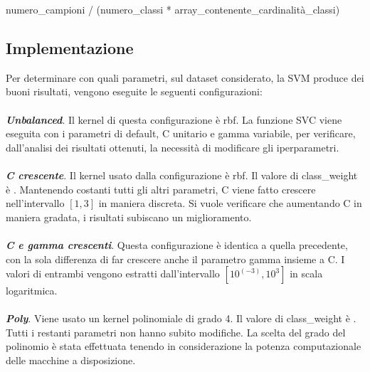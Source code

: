 \documentclass[12pt,a4paper,oneside,hidelinks]{report}
\begin{document}
\begin{center}
numero\_campioni / (numero\_classi * array\_contenente\_cardinalità\_classi)
\end{center}

\subsection{Implementazione}
Per determinare con quali parametri, sul dataset considerato, la SVM produce dei buoni risultati, vengono eseguite le seguenti configurazioni:

\paragraph*{}
\textbf{\textit{Unbalanced}}. Il kernel di questa configurazione è rbf. La funzione SVC viene eseguita con i parametri di default, C unitario e gamma variabile, per verificare, dall'analisi dei risultati ottenuti, la necessità di modificare gli iperparametri.

\paragraph*{}
\textbf{\textit{C crescente}}. Il kernel usato dalla configurazione è rbf. Il valore di class\_weight è . Mantenendo costanti tutti gli altri parametri, C viene fatto crescere nell'intervallo $[1,3]$ in maniera discreta. Si vuole verificare che aumentando C in maniera gradata, i risultati subiscano un miglioramento.

\paragraph*{}
\textbf{\textit{C e gamma crescenti}}. Questa configurazione è identica a quella precedente, con la sola differenza di far crescere anche il parametro gamma insieme a C. I valori di entrambi vengono estratti dall'intervallo $[10^(-3), 10^3]$ in scala logaritmica.

\paragraph*{}
\textbf{\textit{Poly}}. Viene usato un kernel polinomiale di grado 4. Il valore di class\_weight è . Tutti i restanti parametri non hanno subito modifiche. La scelta del grado del polinomio è stata effettuata tenendo in considerazione la potenza computazionale delle macchine a disposizione.
\end{document}
